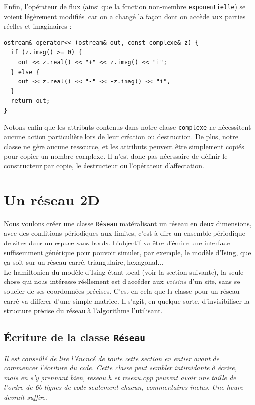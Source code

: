 \documentclass{book}
\newcommand{\inline}[1]{\texttt{#1}}
\def\filename{\emph}
\begin{document}
\begin{correction}
Enfin, l'opérateur de flux (ainsi que la fonction non-membre \inline{exponentielle}) se voient légèrement modifiés, car on a changé la façon dont on accède aux parties réelles et imaginaires :
\begin{verbatim}
ostream& operator<< (ostream& out, const complexe& z) {
  if (z.imag() >= 0) {
    out << z.real() << "+" << z.imag() << "i";
  } else {
    out << z.real() << "-" << -z.imag() << "i";
  }
  return out;
}
\end{verbatim}

Notons enfin que les attributs contenus dans notre classe \inline{complexe} ne nécessitent aucune action particulière lors de leur création ou destruction. De plus, notre classe ne gère aucune ressource, et les attributs peuvent être simplement copiés pour copier un nombre complexe. Il n'est donc pas nécessaire de définir le constructeur par copie, le destructeur ou l'opérateur d'affectation.
\end{correction}

\section{Un réseau 2D}

Nous voulons créer une classe \inline{Réseau} matéralisant un réseau en deux dimensions, avec des conditions périodiques aux limites, c'est-à-dire un ensemble périodique de sites dans un espace sans bords. L'objectif va être d'écrire une interface suffisemment générique pour pouvoir simuler, par exemple, le modèle d'Ising, que ça soit sur un réseau carré, triangulaire, hexagonal...\\

Le hamiltonien du modèle d'Ising étant local (voir la section suivante), la seule chose qui nous intéresse réellement est d'accéder aux \emph{voisins} d'un site, sans se soucier de ses coordonnées précises. C'est en cela que la classe pour un réseau carré va différer d'une simple matrice. Il s'agit, en quelque sorte, d'invisibiliser la structure précise du réseau à l'algorithme l'utilisant.\\

\subsection{Écriture de la classe \inline{Réseau}}
\emph{Il est conseillé de lire l'énoncé de toute cette section en entier avant de commencer l'écriture du code. Cette classe peut sembler intimidante à écrire, mais en s'y prennant bien, \filename{reseau.h} et \filename{reseau.cpp} peuvent avoir une taille de l'ordre de 60 lignes de code seulement chacun, commentaires inclus. Une heure devrait suffire.}\\
\end{document}
